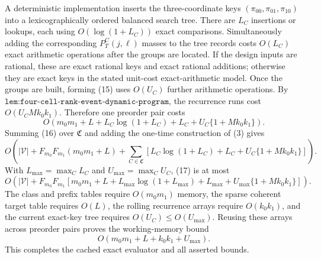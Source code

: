 A deterministic implementation inserts the three-coordinate keys \((\pi_{00},\pi_{01},\pi_{10})\) into a lexicographically ordered balanced search tree. There are \(L_C\) insertions or lookups, each using \(O(\log(1+L_C))\) exact comparisons. Simultaneously adding the corresponding \(P_T^C(j,\ell)\) masses to the tree records costs \(O(L_C)\) exact arithmetic operations after the groups are located. If the design inputs are rational, these are exact rational keys and exact rational additions; otherwise they are exact keys in the stated unit-cost exact-arithmetic model. Once the groups are built, forming (15) uses \(O(U_C)\) further arithmetic operations. By \(\texttt{lem:four-cell-rank-event-dynamic-program}\), the recurrence runs cost \(O(U_CMk_0k_1)\). Therefore one preorder pair costs
\[
O\!\left(m_0m_1+L+L_C\log(1+L_C)+L_C+U_C\{1+Mk_0k_1\}\right).\tag{16}
\]
Summing (16) over \(\mathfrak C\) and adding the one-time construction of (3) gives
\[
O\!\left(
|\mathcal V|+F_{m_0}F_{m_1}(m_0m_1+L)+\sum_{C\in\mathfrak C}\left[L_C\log(1+L_C)+L_C+U_C\{1+Mk_0k_1\}\right]
\right).\tag{17}
\]
With \(L_{\max}=\max_C L_C\) and \(U_{\max}=\max_C U_C\), (17) is at most
\[
O\!\left(|\mathcal V|+F_{m_0}F_{m_1}\left[m_0m_1+L+L_{\max}\log(1+L_{\max})+L_{\max}+U_{\max}\{1+Mk_0k_1\}\right]\right).\tag{18}
\]
The class and prefix tables require \(O(m_0m_1)\) memory, the sparse coherent target table requires \(O(L)\), the rolling recurrence arrays require \(O(k_0k_1)\), and the current exact-key tree requires \(O(U_C)\le O(U_{\max})\). Reusing these arrays across preorder pairs proves the working-memory bound
\[
O(m_0m_1+L+k_0k_1+U_{\max}).\tag{19}
\]
This completes the cached exact evaluator and all asserted bounds.
